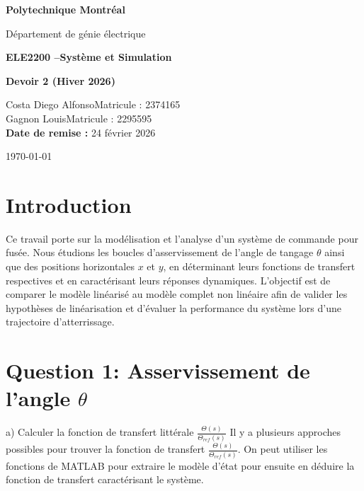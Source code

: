 \documentclass[11pt]{article}
\begin{document}
    \begin{titlepage}
        \centering
        \vspace*{2cm}
        {\LARGE \textbf{Polytechnique Montréal}\par}
        \vspace{0.5cm}
        {\Large Département de génie électrique\par}
        \vspace{2cm}
        {\Huge \textbf{ELE2200 --Système et Simulation}\par}
        \vspace{0.5cm}
        {\Huge \textbf{Devoir 2 (Hiver 2026)}\par}
        \vspace{2cm}

        \begin{flushleft}
            Costa Diego Alfonso\hfill Matricule : 2374165\\
            Gagnon Louis\hfill Matricule : 2295595\\
            \vspace{0.8cm}
            \textbf{Date de remise :} 24 février 2026\\
        \end{flushleft}

        \vfill
        {\large \today\par}
    \end{titlepage}


    \tableofcontents
    \clearpage

    \section{Introduction}
    Ce travail porte sur la modélisation et l'analyse d'un système de commande pour fusée. Nous étudions les boucles d'asservissement de l'angle de tangage $\theta$ ainsi que des positions horizontales $x$ et $y$, en déterminant leurs fonctions de transfert respectives et en caractérisant leurs réponses dynamiques. L'objectif est de comparer le modèle linéarisé au modèle complet non linéaire afin de valider les hypothèses de linéarisation et d'évaluer la performance du système lors d'une trajectoire d'atterrissage.



    \section{Question 1: Asservissement de l'angle \texorpdfstring{$\theta$}{theta}}
     a) Calculer la fonction de transfert littérale $\frac{\Theta(s)}{\Theta_{ref}(s)}$ \newline
    Il y a plusieurs approches possibles pour trouver la fonction de transfert $\frac{\Theta(s)}{\Theta_{ref}(s)}$. On peut utiliser les fonctions de MATLAB pour extraire le modèle d'état pour ensuite en déduire la fonction de transfert caractérisant le système.
\end{document}
